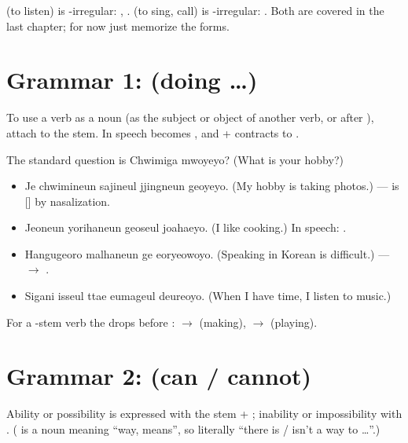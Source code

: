 \begin{remark}
 (to listen) is -irregular: , .  (to sing,
call) is -irregular: . Both are covered in the last chapter; for now
just memorize the forms.
\end{remark}

\section{Grammar 1:  (doing \ldots)}

To use a verb as a noun (as the subject or object of another verb, or after
), attach  to the stem. In speech  becomes , and
 +  contracts to .

\begin{example}
The standard question is  Chwimiga mwoyeyo? (What is your hobby?)
\begin{itemize}
  \item {} Je chwimineun sajineul jjingneun geoyeyo. (My
        hobby is taking photos.) ---  is [] by nasalization.
  \item {} Jeoneun yorihaneun geoseul joahaeyo. (I like
        cooking.) In speech: .
  \item {} Hangugeoro malhaneun ge eoryeowoyo. (Speaking in
        Korean is difficult.) ---  $\to$ .
  \item {} Sigani isseul ttae eumageul deureoyo. (When I
        have time, I listen to music.)
\end{itemize}
\end{example}

For a -stem verb the  drops before :  $\to$
 (making),  $\to$  (playing).

\section{Grammar 2:  (can / cannot)}

Ability or possibility is expressed with the stem + ; inability or
impossibility with . ( is a noun meaning ``way, means'', so
literally ``there is / isn't a way to \ldots''.)

